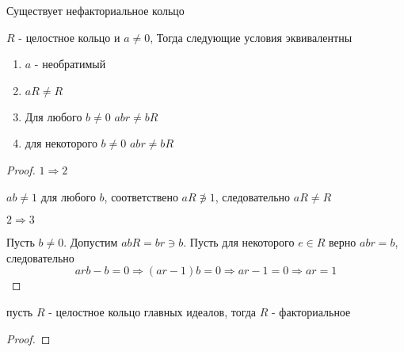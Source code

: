\documentclass[../main/document.tex]{subfiles}
\begin{document}
\begin{thm}
Существует нефакториальное кольцо
\end{thm}
\begin{thm}
$R$ - целостное кольцо и $a\neq 0$, Тогда следующие условия эквивалентны
\begin{enumerate}
\item $a$ - необратимый
\item $aR\neq R$
\item Для любого $b\neq 0$ $abr\neq bR$
\item для некоторого $b\neq 0$ $abr\neq bR$
\end{enumerate}
\begin{proof}

$1\Rightarrow 2$

$ab\neq 1$ для любого $b$, соответствено $aR\not\ni 1$, следовательно $aR\neq R$

$2\Rightarrow 3$

Пусть $b\neq 0$. Допустим $abR=br\ni b$. Пусть для некоторого $e\in R$ верно $abr=b$, следовательно
$$arb-b=0\Rightarrow (ar-1)b=0\Rightarrow ar-1=0\Rightarrow ar=1$$
\end{proof}
\end{thm}
\begin{thm}
пусть $R$ - целостное кольцо главных идеалов, тогда $R$ - факториальное
\begin{proof}

\end{proof}
\end{thm}
\end{document}
